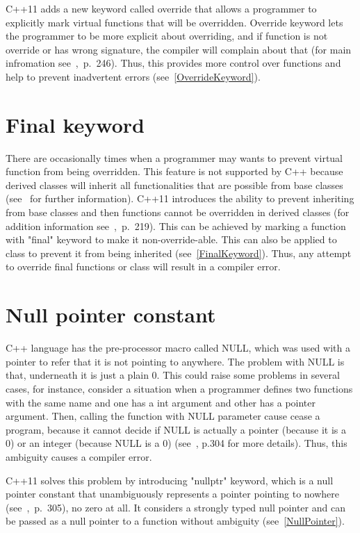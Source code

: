 \documentclass[11pt]{report}
\begin{document}
C++11 adds a new keyword called override that allows a programmer to explicitly mark virtual functions that will be overridden. Override keyword lets the programmer to be more explicit about overriding, and if function is not override or has wrong signature, the compiler will complain about that (for main infromation see~\cite{Gregorie:professionalcpp},~p.~246). Thus, this provides more control over functions and help to prevent inadvertent errors (see~\ref{OverrideKeyword}).

\section{Final keyword}
\label{section: Final keyword}
There are occasionally times when a programmer may wants to prevent virtual function from being overridden. This feature is not supported by C++ because derived classes will inherit all functionalities that are possible from base classes (see~\cite{Stroustrup:2012:Cpp11} for further information). C++11 introduces the ability to prevent inheriting from base classes and then functions cannot be overridden in derived classes (for addition information see~\cite{Gregorie:professionalcpp},~p.~219). This can be achieved by marking a function with "final" keyword to make it non-override-able. This can also be applied to class to prevent it from being inherited (see~\ref{FinalKeyword}). Thus, any attempt to override final functions or class will result in a compiler error.

\section{Null pointer constant}
\label{section: Null pointer constant}
C++ language has the pre-processor macro called NULL, which was used with a pointer to refer that it is not pointing to anywhere. The problem with NULL is that, underneath it is just a plain 0. This could raise some problems in several cases, for instance, consider a situation when a programmer defines two functions with the same name and one has a int argument and other has a pointer argument. Then, calling the function with NULL parameter cause cease a program, because it cannot decide if NULL is actually a pointer (because it is a 0) or an integer (because NULL is a 0) (see~\cite{Gregorie:professionalcpp}, p.304 for more details). Thus, this ambiguity causes a compiler error.

C++11 solves this problem by introducing "nullptr" keyword, which is a null pointer constant that unambiguously represents a pointer pointing to nowhere (see~\cite{Gregorie:professionalcpp},~p.~305), no zero at all. It considers a strongly typed null pointer and can be passed as a null pointer to a function without ambiguity (see~\ref{NullPointer}). 
\end{document}
